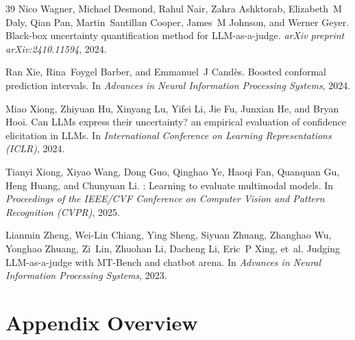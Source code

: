 \documentclass{article}
\begin{document}
\begin{thebibliography}{39}
Nico Wagner, Michael Desmond, Rahul Nair, Zahra Ashktorab, Elizabeth~M Daly, Qian Pan, Martin~Santillan Cooper, James~M Johnson, and Werner Geyer.
\newblock Black-box uncertainty quantification method for {LLM}-as-a-judge.
\newblock \emph{arXiv preprint arXiv:2410.11594}, 2024.

Ran Xie, Rina~Foygel Barber, and Emmanuel~J Cand{\`e}s.
\newblock Boosted conformal prediction intervals.
\newblock In \emph{Advances in Neural Information Processing Systems}, 2024.

Miao Xiong, Zhiyuan Hu, Xinyang Lu, Yifei Li, Jie Fu, Junxian He, and Bryan Hooi.
\newblock Can {LLMs} express their uncertainty? an empirical evaluation of confidence elicitation in {LLMs}.
\newblock In \emph{International Conference on Learning Representations (ICLR)}, 2024.

Tianyi Xiong, Xiyao Wang, Dong Guo, Qinghao Ye, Haoqi Fan, Quanquan Gu, Heng Huang, and Chunyuan Li.
: Learning to evaluate multimodal models.
\newblock In \emph{Proceedings of the IEEE/CVF Conference on Computer Vision and Pattern Recognition (CVPR)}, 2025.

Lianmin Zheng, Wei-Lin Chiang, Ying Sheng, Siyuan Zhuang, Zhanghao Wu, Yonghao Zhuang, Zi~Lin, Zhuohan Li, Dacheng Li, Eric~P Xing, et~al.
\newblock Judging {LLM}-as-a-judge with {MT-Bench} and chatbot arena.
\newblock In \emph{Advances in Neural Information Processing Systems}, 2023.

\end{thebibliography}

\appendix

\section*{Appendix Overview}
\end{document}
